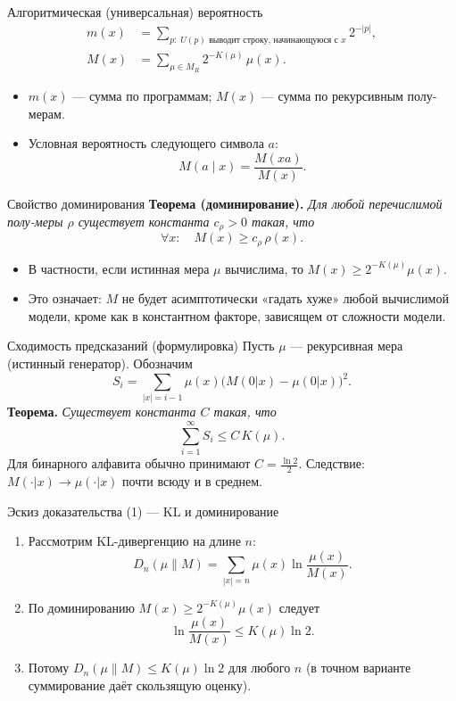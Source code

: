 \documentclass{beamer}
\begin{document}
\begin{frame}{Алгоритмическая (универсальная) вероятность}
  \begin{align*}
    m(x) &= \sum_{p:\;U(p)\text{ выводит строку, начинающуюся с }x} 2^{-|p|},\\
    M(x) &= \sum_{\mu\in M_R} 2^{-K(\mu)}\,\mu(x).
  \end{align*}
  \begin{itemize}
    \item $m(x)$ — сумма по программам; $M(x)$ — сумма по рекурсивным полу-мерам.
    \item Условная вероятность следующего символа $a$:
    \[
      M(a\mid x)=\frac{M(xa)}{M(x)}.
    \]
  \end{itemize}
\end{frame}

\begin{frame}{Свойство доминирования}
  \textbf{Теорема (доминирование).}
  \emph{Для любой перечислимой полу-меры $\rho$ существует константа $c_\rho>0$ такая, что}
  \[
    \forall x:\quad M(x) \ge c_\rho\,\rho(x).
  \]
  \begin{itemize}
    \item В частности, если истинная мера $\mu$ вычислима, то $M(x)\ge 2^{-K(\mu)}\mu(x)$.
    \item Это означает: $M$ не будет асимптотически «гадать хуже» любой вычислимой модели, кроме как в константном факторе, зависящем от сложности модели.
  \end{itemize}
\end{frame}

\begin{frame}{Сходимость предсказаний (формулировка)}
  Пусть $\mu$ — рекурсивная мера (истинный генератор). Обозначим
  \[
    S_i = \sum_{|x|=i-1} \mu(x)\bigl(M(0|x)-\mu(0|x)\bigr)^2.
  \]
  \textbf{Теорема.} \emph{Существует константа $C$ такая, что}
  \[
    \sum_{i=1}^\infty S_i \le C\,K(\mu).
  \]
  Для бинарного алфавита обычно принимают $C=\frac{\ln 2}{2}$. Следствие: $M(\cdot|x)\to\mu(\cdot|x)$ почти всюду и в среднем. 
  
\end{frame}

\begin{frame}{Эскиз доказательства (1) — KL и доминирование}
  \begin{enumerate}
    \item Рассмотрим KL-дивергенцию на длине $n$:
    \[
      D_n(\mu\|M)=\sum_{|x|=n} \mu(x)\ln\frac{\mu(x)}{M(x)}.
    \]
    \item По доминированию $M(x)\ge 2^{-K(\mu)}\mu(x)$ следует
    \[
      \ln\frac{\mu(x)}{M(x)} \le K(\mu)\ln 2.
    \]
    \item Потому $D_n(\mu\|M) \le K(\mu)\ln 2$ для любого $n$ (в точном варианте суммирование даёт скользящую оценку).
  \end{enumerate}\
\end{frame}
\end{document}

